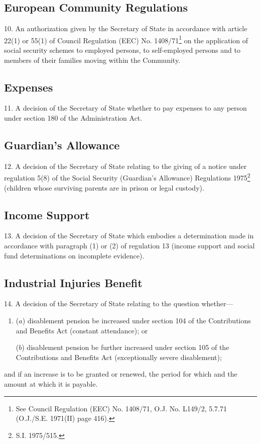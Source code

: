 \documentclass[12pt,a4paper]{article}
\begin{document}
\subsection*{European Community Regulations}

10.  An authorization given by the Secretary of State in accordance with article 22(1) or 55(1) of Council Regulation (EEC) No. 1408/71\footnote{\frenchspacing See Council Regulation (EEC) No. 1408/71, O.J. No. L149/2, 5.7.71 (O.J./S.E. 1971(II) page 416).} on the application of social security schemes to employed persons, to self-employed persons and to members of their families moving within the Community.

\subsection*{Expenses}

11.  A decision of the Secretary of State whether to pay expenses to any person under section 180 of the Administration Act.

\subsection*{Guardian’s Allowance}

12.  A decision of the Secretary of State relating to the giving of a notice under regulation 5(8) of the Social Security (Guardian’s Allowance) Regulations 1975\footnote{\frenchspacing S.I. 1975/515.} (children whose surviving parents are in prison or legal custody).

\subsection*{Income Support}

13.  A decision of the Secretary of State which embodies a determination made in accordance with paragraph (1) or (2) of regulation 13 (income support and social fund determinations on incomplete evidence).

\subsection*{Industrial Injuries Benefit}

14.  A decision of the Secretary of State relating to the question whether—
\begin{enumerate}\item[]
($a$) disablement pension be increased under section 104 of the Contributions and Benefits Act (constant attendance); or

($b$) disablement pension be further increased under section 105 of the Contributions and Benefits Act (exceptionally severe disablement);
\end{enumerate}
and if an increase is to be granted or renewed, the period for which and the amount at which it is payable.
\end{document}
